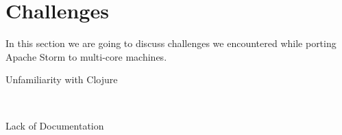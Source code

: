 
\section{Challenges}
\label{sec:challenges}

In this section we are going to discuss challenges we encountered while porting Apache Storm to multi-core machines.

\begin{description}
	\item[Unfamiliarity with Clojure] \hfill \\
	
	\item[Lack of Documentation] \hfill \\
	
\end{description}

